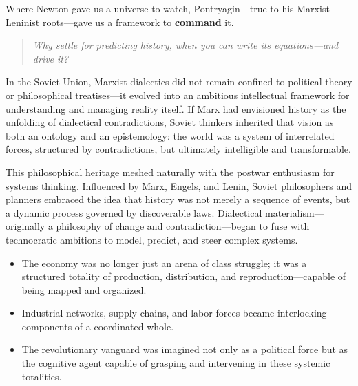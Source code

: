 Where Newton gave us a universe to watch, Pontryagin—true to his Marxist-Leninist roots—gave us a framework to \textbf{command} it.

\begin{quote}
\emph{Why settle for predicting history, when you can write its equations—and drive it?}
\end{quote}


\begin{tcolorbox}[colback=gray!10, colframe=black, title={Sidebar: From Marxist Dialectics to Soviet Cybernetic Planning}, fonttitle=\bfseries, breakable]

    In the Soviet Union, Marxist dialectics did not remain confined to political theory or philosophical treatises—it evolved into an ambitious intellectual framework for understanding and managing reality itself. If Marx had envisioned history as the unfolding of dialectical contradictions, Soviet thinkers inherited that vision as both an ontology and an epistemology: the world was a system of interrelated forces, structured by contradictions, but ultimately intelligible and transformable.
    
    \medskip
    
    This philosophical heritage meshed naturally with the postwar enthusiasm for systems thinking. Influenced by Marx, Engels, and Lenin, Soviet philosophers and planners embraced the idea that history was not merely a sequence of events, but a dynamic process governed by discoverable laws. Dialectical materialism—originally a philosophy of change and contradiction—began to fuse with technocratic ambitions to model, predict, and steer complex systems.
    
    \medskip
    
    \begin{itemize}
      \item The economy was no longer just an arena of class struggle; it was a structured totality of production, distribution, and reproduction—capable of being mapped and organized.
      \item Industrial networks, supply chains, and labor forces became interlocking components of a coordinated whole.
      \item The revolutionary vanguard was imagined not only as a political force but as the cognitive agent capable of grasping and intervening in these systemic totalities.
    \end{itemize}
    
    \medskip
    

\end{tcolorbox}
